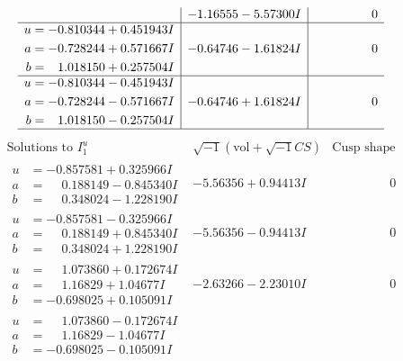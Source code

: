 \documentclass[1p]{elsarticle_modified}
\theoremstyle{definition}
\newcommand{\I}{\sqrt{-1}}
\begin{document}
$$\begin{array}{c|c|c}
 & -1.16555 - 5.57300 I & \phantom{-0.000000 } 0 \\ \hline\begin{aligned}
u &= -0.810344 + 0.451943 I \\
a &= -0.728244 + 0.571667 I \\
b &= \phantom{-}1.018150 + 0.257504 I\end{aligned}
 & -0.64746 - 1.61824 I & \phantom{-0.000000 } 0 \\ \hline\begin{aligned}
u &= -0.810344 - 0.451943 I \\
a &= -0.728244 - 0.571667 I \\
b &= \phantom{-}1.018150 - 0.257504 I\end{aligned}
 & -0.64746 + 1.61824 I & \phantom{-0.000000 } 0\\
 \hline 
 \end{array}$$\newpage$$\begin{array}{c|c|c}  
\text{Solutions to }I^u_{1}& \I (\text{vol} + \sqrt{-1}CS) & \text{Cusp shape}\\
 \hline 
\begin{aligned}
u &= -0.857581 + 0.325966 I \\
a &= \phantom{-}0.188149 - 0.845340 I \\
b &= \phantom{-}0.348024 - 1.228190 I\end{aligned}
 & -5.56356 + 0.94413 I & \phantom{-0.000000 } 0 \\ \hline\begin{aligned}
u &= -0.857581 - 0.325966 I \\
a &= \phantom{-}0.188149 + 0.845340 I \\
b &= \phantom{-}0.348024 + 1.228190 I\end{aligned}
 & -5.56356 - 0.94413 I & \phantom{-0.000000 } 0 \\ \hline\begin{aligned}
u &= \phantom{-}1.073860 + 0.172674 I \\
a &= \phantom{-}1.16829 + 1.04677 I \\
b &= -0.698025 + 0.105091 I\end{aligned}
 & -2.63266 - 2.23010 I & \phantom{-0.000000 } 0 \\ \hline\begin{aligned}
u &= \phantom{-}1.073860 - 0.172674 I \\
a &= \phantom{-}1.16829 - 1.04677 I \\
b &= -0.698025 - 0.105091 I\end{aligned}

\end{array}$$
\end{document}
